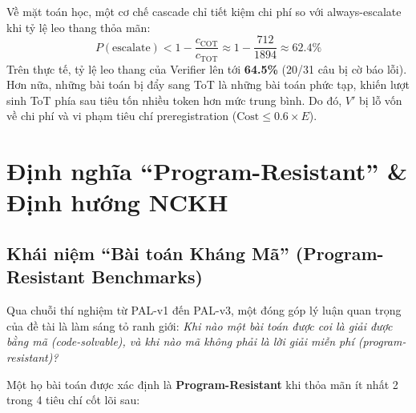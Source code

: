 \documentclass[11pt,a4paper]{report}
\begin{document}
\begin{tcolorbox}[title=Nguyên nhân Kinh tế Tính toán của Nghịch lý $V'$]
Về mặt toán học, một cơ chế cascade chỉ tiết kiệm chi phí so với always-escalate khi tỷ lệ leo thang thỏa mãn:
$$P(\text{escalate}) < 1 - \frac{c_{\text{COT}}}{c_{\text{TOT}}} \approx 1 - \frac{712}{1894} \approx 62.4\%$$
Trên thực tế, tỷ lệ leo thang của Verifier lên tới \textbf{64.5\%} (20/31 câu bị cờ báo lỗi). Hơn nữa, những bài toán bị đẩy sang ToT là những bài toán phức tạp, khiến lượt sinh ToT phía sau tiêu tốn nhiều token hơn mức trung bình. Do đó, $V'$ bị lỗ vốn về chi phí và vi phạm tiêu chí preregistration ($\text{Cost} \le 0.6\times E$).
\end{tcolorbox}

\newpage

\chapter{Định nghĩa ``Program-Resistant'' \& Định hướng NCKH}

\section{Khái niệm ``Bài toán Kháng Mã'' (Program-Resistant Benchmarks)}

Qua chuỗi thí nghiệm từ PAL-v1 đến PAL-v3, một đóng góp lý luận quan trọng của đề tài là làm sáng tỏ ranh giới: \textit{Khi nào một bài toán được coi là giải được bằng mã (code-solvable), và khi nào mã không phải là lời giải miễn phí (program-resistant)?}

Một họ bài toán được xác định là \textbf{Program-Resistant} khi thỏa mãn ít nhất 2 trong 4 tiêu chí cốt lõi sau:
\end{document}
